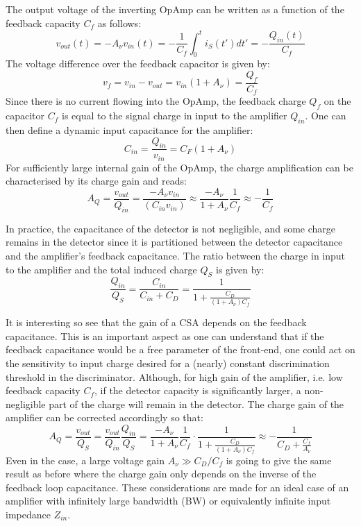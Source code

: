 		The output voltage of the inverting OpAmp can be written as a function of the feedback capacity $C_f$ as follows: 
		\begin{equation}
			v_{out}(t) = -A_\nu v_{in}(t) = -\frac{1}{C_f} \int_0^t i_S(t') dt' = -\frac{Q_{in}(t)}{C_f}
		\end{equation}
		The voltage difference over the feedback capacitor is given by: 
		\begin{equation}
			v_f = v_{in} - v_{out} = v_{in}(1+A_\nu) = \frac{Q_f}{C_f}
		\end{equation}
		Since there is no current flowing into the OpAmp, the feedback charge $Q_f$ on the capacitor $C_f$ is equal to the signal charge in input to the amplifier $Q_{in}$. One can then define a dynamic input capacitance for the amplifier: 
		\begin{equation}
			C_{in} = \frac{Q_{in}}{v_{in}} = C_F(1+A_\nu)
		\end{equation}
		For sufficiently large internal gain of the OpAmp, the charge amplification can be characterised by its charge gain and reads: 
		\begin{equation}
			A_Q = \frac{v_{out}}{Q_{in}} = \frac{-A_\nu v_{in}}{(C_{in}v_{in})} \approx \frac{-A_\nu}{1+A_\nu} \frac{1}{C_f} \approx -\frac{1}{C_f}
		\end{equation}
		
		In practice, the capacitance of the detector is not negligible, and some charge remains in the detector since it is partitioned between the detector capacitance and the amplifier's feedback capacitance. The ratio between the charge in input to the amplifier and the total induced charge $Q_S$ is given by:
		\begin{equation}
			\frac{Q_{in}}{Q_S} = \frac{C_{in}}{C_{in} + C_D} = \frac{1}{1+\frac{C_D}{(1+A_\nu)C_f}}
		\end{equation}

		It is interesting so see that the gain of a CSA depends on the feedback capacitance. This is an important aspect as one can understand that if the feedback capacitance would be a free parameter of the front-end, one could act on the sensitivity to input charge desired for a (nearly) constant discrimination threshold in the discriminator. Although, for high gain of the amplifier, i.e. low feedback capacity $C_f$, if the detector capacity is significantly larger, a non-negligible part of the charge will remain in the detector. The charge gain of the amplifier can be corrected accordingly so that: 
		\begin{equation}
			A_Q = \frac{v_{out}}{Q_S} = \frac{v_{out}}{Q_{in}}\frac{Q_{in}}{Q_S} = \frac{-A_\nu}{1+A_\nu} \frac{1}{C_f} \cdot \frac{1}{1+\frac{C_D}{(1+A_\nu)C_f}} \approx - \frac{1}{C_D + \frac{C_f}{A_\nu}}
		\end{equation} 
		Even in the case, a large voltage gain $A_\nu \gg C_D/C_f$ is going to give the same result as before where the charge gain only depends on the inverse of the feedback loop capacitance. These considerations are made for an ideal case of an amplifier with infinitely large bandwidth (BW) or equivalently infinite input impedance $Z_{in}$. 


